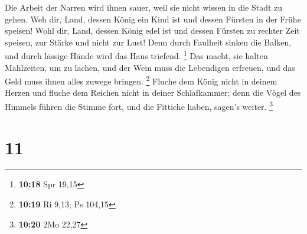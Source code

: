  Die Arbeit der Narren wird ihnen sauer, weil sie nicht
wissen in die Stadt zu gehen.  Weh dir, Land, dessen König
ein Kind ist und dessen Fürsten in der Frühe speisen!  Wohl
dir, Land, dessen König edel ist und dessen Fürsten zu rechter Zeit
speisen, zur Stärke und nicht zur Lust!  Denn durch
Faulheit sinken die Balken, und durch lässige Hände wird das Haus
triefend. \footnote{\textbf{10:18} Spr 19,15}  Das macht,
sie halten Mahlzeiten, um zu lachen, und der Wein muss die Lebendigen
erfreuen, und das Geld muss ihnen alles zuwege bringen. \footnote{\textbf{10:19}
  Ri 9,13; Ps 104,15}  Fluche dem König nicht in deinem
Herzen und fluche dem Reichen nicht in deiner Schlafkammer; denn die
Vögel des Himmels führen die Stimme fort, und die Fittiche haben,
sagen's weiter. \footnote{\textbf{10:20} 2Mo 22,27}

\hypertarget{section-4}{%
\section{11}\label{section-4}}

